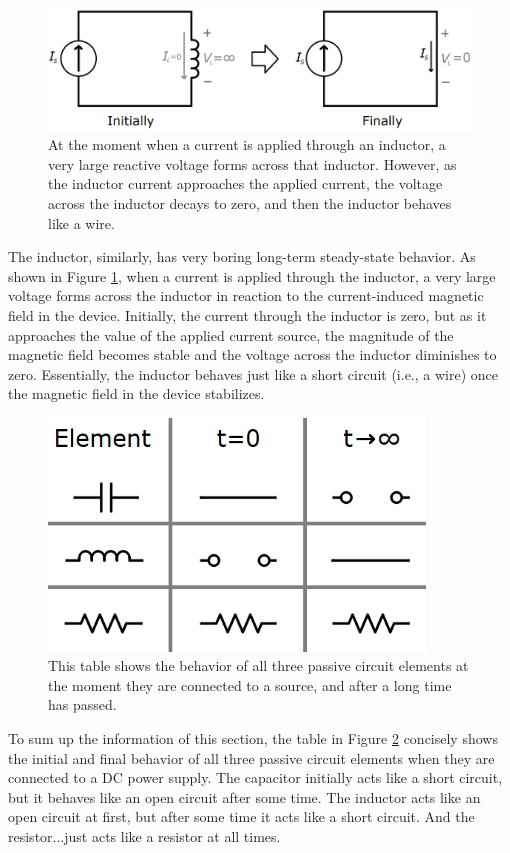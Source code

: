 \begin{figure}[h!]
\centering
\includegraphics[width=13cm]{figures/inductorAndCurrent.png}
\caption{At the moment when a current is applied through an inductor, a very large reactive voltage forms across that inductor. However, as the inductor current approaches the applied current, the voltage across the inductor decays to zero, and then the inductor behaves like a wire.}
\label{inductorSteadyState}
\end{figure}
\par
The inductor, similarly, has very boring long-term steady-state behavior. As shown in Figure \ref{inductorSteadyState}, when a current is applied through the inductor, a very large voltage forms across the inductor in reaction to the current-induced magnetic field in the device. Initially, the current through the inductor is zero, but as it approaches the value of the applied current source, the magnitude of the magnetic field becomes stable and the voltage across the inductor diminishes to zero. Essentially, the inductor behaves just like a short circuit (i.e., a wire) once the magnetic field in the device stabilizes.
\begin{figure}[h!]
\centering
\includegraphics[width=10cm]{figures/RLClongTerm.png}
\caption{This table shows the behavior of all three passive circuit elements at the moment they are connected to a source, and after a long time has passed.}
\label{RLClongTerm}
\end{figure}
\par
To sum up the information of this section, the table in Figure \ref{RLClongTerm} concisely shows the initial and final behavior of all three passive circuit elements when they are connected to a DC power supply. The capacitor initially acts like a short circuit, but it behaves like an open circuit after some time. The inductor acts like an open circuit at first, but after some time it acts like a short circuit. And the resistor...just acts like a resistor at all times.


